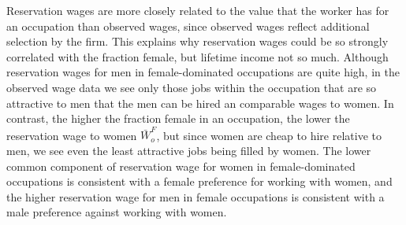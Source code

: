 \documentclass[12pt]{article}
\begin{document}




Reservation wages are more closely related to the value that the worker has for an occupation than observed wages, since observed wages reflect additional selection by the firm. This explains why reservation wages could be so strongly correlated with the fraction female, but lifetime income not so much. Although reservation wages for men in female-dominated occupations are quite high, in the observed wage data we see only those jobs within the occupation that are so attractive to men that the men can be hired an comparable wages to women. In contrast, the higher the fraction female in an occupation, the lower the reservation wage to women $\bar{W}^F_o$, but since women are cheap to hire relative to men, we see even the least attractive jobs being filled by women. The lower common component of reservation wage for women in female-dominated occupations is consistent with a female preference for working with women, and the higher reservation wage for men in female occupations is consistent with a male preference against working with women.











\end{document}

